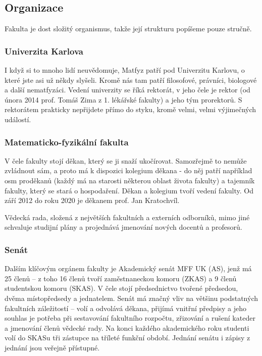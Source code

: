 \subsection{Organizace}
Fakulta je dost složitý organismus,
takže její strukturu popíšeme pouze stručně.


\subsubsection{Univerzita Karlova}
I když si to mnoho lidí neuvědomuje, Matfyz patří pod Univerzitu Karlovu, o
které jste asi už někdy slyšeli. Kromě nás tam patří filosofové, právníci,
biologové a další nematfyzáci. Vedení univerzity se říká rektorát, v jeho čele
je rektor (od února 2014 prof. Tomáš Zima z 1. lékářské fakulty) a jeho tým
prorektorů. S rektorátem prakticky nepřijdete přímo do styku, kromě velmi,
velmi výjimečných událostí.


\subsubsection{Matematicko-fyzikální fakulta}
V čele fakulty stojí děkan, který se ji snaží ukočírovat. Samozřejmě to nemůže zvládnout sám, a proto má k dispozici kolegium děkana - do něj patří například osm proděkanů (každý má na starosti některou oblast života fakulty) a tajemník fakulty, který se stará o hospodaření. Děkan a kolegium tvoří vedení fakulty. Od září 2012 do roku 2020 je děkanem prof. Jan Kratochvíl.

Vědecká rada, složená z největších fakultních a externích odborníků, mimo jiné schvaluje studijní plány a projednává jmenování nových docentů a profesorů.


\subsubsection{Senát}
Dalším klíčovým orgánem fakulty je Akademický senát MFF UK (AS), jenž má 25 členů – z toho 16 členů tvoří zaměstnaneckou komoru (ZKAS) a 9 členů studentskou komoru (SKAS). V čele stojí předsednictvo tvořené předsedou, dvěma místopředsedy a jednatelem. Senát má značný vliv na většinu podstatných fakultních záležitostí – volí a odvolává děkana, přijímá vnitřní předpisy a jeho souhlas je potřeba při sestavování fakultního rozpočtu, zřizování a rušení kateder a jmenování členů vědecké rady. Na konci každého akademického roku studenti volí do SKASu tři zástupce na tříleté funkční období. Jednání senátu i zápisy z jednání jsou veřejně přístupné.

